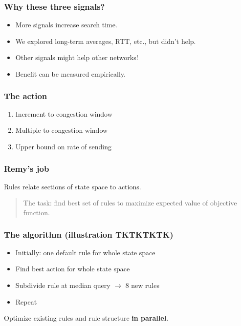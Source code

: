 \documentclass[svgnames]{beamer}
\newcommand{\ssline}{\vspace{8 pt}}
\begin{document}
\begin{frame}
\frametitle{Why these three signals?}

\begin{itemize}

\item More signals increase search time.

\item We explored long-term averages, RTT, etc., but didn't help.

\item Other signals might help other networks!

\item Benefit can be measured empirically.

\end{itemize}

\end{frame}

\begin{frame}
\frametitle{The action}

\begin{enumerate}

\item Increment to congestion window

\item Multiple to congestion window

\item Upper bound on rate of sending

\end{enumerate}

\end{frame}

\begin{frame}
\frametitle{Remy's job}

Rules relate sections of state space to actions.

\begin{quote}
The task: find best set of rules to maximize expected value of
objective function.

\end{quote}

\end{frame}

\begin{frame}
\frametitle{The algorithm (illustration TKTKTKTK)}

\begin{itemize}
\item Initially: one default rule for whole state space

\item Find best action for whole state space

\item Subdivide rule at median query $\rightarrow$ 8 new rules

\item Repeat

\end{itemize}

\ssline

Optimize existing rules and rule structure \textbf{in parallel}.

\end{frame}
\end{document}
